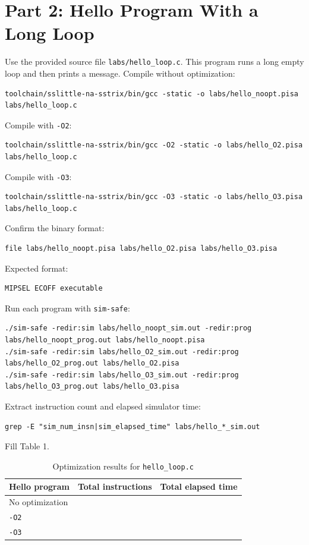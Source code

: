 \documentclass[11pt]{article}
\begin{document}
\section{Part 2: Hello Program With a Long Loop}
Use the provided source file \texttt{labs/hello\_loop.c}. This program runs a long empty loop and then prints a message.
Compile without optimization:
\begin{lstlisting}
toolchain/sslittle-na-sstrix/bin/gcc -static -o labs/hello_noopt.pisa labs/hello_loop.c
\end{lstlisting}
Compile with \texttt{-O2}:
\begin{lstlisting}
toolchain/sslittle-na-sstrix/bin/gcc -O2 -static -o labs/hello_O2.pisa labs/hello_loop.c
\end{lstlisting}
Compile with \texttt{-O3}:
\begin{lstlisting}
toolchain/sslittle-na-sstrix/bin/gcc -O3 -static -o labs/hello_O3.pisa labs/hello_loop.c
\end{lstlisting}
Confirm the binary format:
\begin{lstlisting}
file labs/hello_noopt.pisa labs/hello_O2.pisa labs/hello_O3.pisa
\end{lstlisting}
Expected format:
\begin{lstlisting}
MIPSEL ECOFF executable
\end{lstlisting}
Run each program with \texttt{sim-safe}:
\begin{lstlisting}
./sim-safe -redir:sim labs/hello_noopt_sim.out -redir:prog labs/hello_noopt_prog.out labs/hello_noopt.pisa
./sim-safe -redir:sim labs/hello_O2_sim.out -redir:prog labs/hello_O2_prog.out labs/hello_O2.pisa
./sim-safe -redir:sim labs/hello_O3_sim.out -redir:prog labs/hello_O3_prog.out labs/hello_O3.pisa
\end{lstlisting}
Extract instruction count and elapsed simulator time:
\begin{lstlisting}
grep -E "sim_num_insn|sim_elapsed_time" labs/hello_*_sim.out
\end{lstlisting}
Fill Table 1.
\begin{table}[htbp]
\centering
\caption{Optimization results for \texttt{hello\_loop.c}}
\label{tab:hello-loop-results}
\small
\setlength{\tabcolsep}{5pt}
\renewcommand{\arraystretch}{1.18}
\begin{tabularx}{\textwidth}{@{}L c c@{}}
\toprule
Hello program & Total instructions & Total elapsed time \\
\midrule
No optimization &  &  \\
\texttt{-O2} &  &  \\
\texttt{-O3} &  &  \\
\bottomrule
\end{tabularx}
\end{table}
\end{document}
